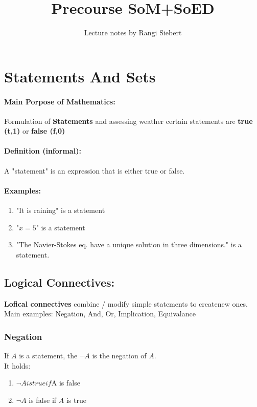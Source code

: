 \documentclass[twocolumn]{article}
\begin{document}
\title{Precourse SoM+SoED}
\author{Lecture notes by Rangi Siebert}
\maketitle
\tableofcontents

\section{Statements And Sets}
			\paragraph{Main Porpose of Mathematics:}
			Formulation of \textbf{Statements} and assessing weather certain 
			statements are \textbf{true (t,1)} or \textbf{false (f,0)} 

			\paragraph{Definition (informal):}
			A "statement" is an expression that is either true or false.

			\paragraph{Examples:}
			\begin{enumerate}
				\item "It is raining" is a statement
				\item "$x=5$" is a statement
				\item "The Navier-Stokes eq. have a unique solution in 
					three dimensions." is a statement.
			\end{enumerate}

	\subsection{Logical Connectives:}
		\textbf{Lofical connectives} combine / modify simple statements to 
		createnew ones. Main examples: Negation, And, Or, Implication, Equivalance

		\subsubsection{Negation}
			If $A$ is a statement, the $\neg A$ is the negation of $A$.\\
			It holds:
			\begin{enumerate}
				\item $\neg A is true if $A is false
				\item $\neg A$ is false if $A$ is true
			\end{enumerate}
\end{document}
